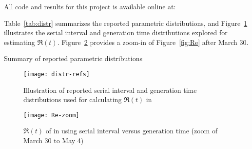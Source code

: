 All code and results for this project is available online at:\\
\par
Table~\ref{tab:distr} summarizes
the reported parametric \covid distributions, and
Figure~\ref{fig:distr-refs} illustrates
the serial interval and generation time distributions
explored for estimating $\Re(t)$.
Figure~\ref{fig:Re-zoom} provides a zoom-in of
Figure~\ref{fig:Re} after March 30.
\par
\begin{table}[h]
  \caption{Summary of reported parametric \covid distributions}
  
  \label{tab:distr}
\end{table}
\par
\begin{figure}[h]
  \centering
  \texttt{[image: distr-refs]}
  \caption{Illustration of reported serial interval and generation time
    distributions used for calculating $\Re(t)$ in \covid}
  \label{fig:distr-refs}
\end{figure}
\par
\begin{figure}[h]
  \centering
  \texttt{[image: Re-zoom]}
  \caption{$\Re(t)$ of \covid in \gta using
    serial interval versus generation time
    (zoom of March 30 to May 4)}
  \label{fig:Re-zoom}
\end{figure}
